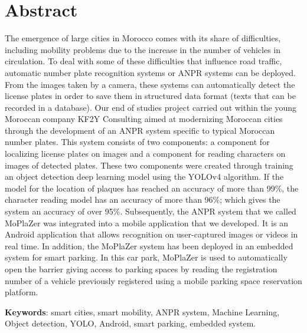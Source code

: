 \chapter*{Abstract}
The emergence of large cities in Morocco comes with its share of difficulties, including mobility problems due to the increase in the number of vehicles in circulation. To deal with some of these difficulties that influence road traffic, automatic number plate recognition systems or ANPR systems can be deployed. From the images taken by a camera, these systems can automatically detect the license plates in order to save them in structured data format (texts that can be recorded in a database). Our end of studies project carried out within the young Moroccan company KF2Y Consulting aimed at modernizing Moroccan cities through the development of an ANPR system specific to typical Moroccan number plates. This system consists of two components: a component for localizing license plates on images and a component for reading characters on images of detected plates. These two components were created through training an object detection deep learning model using the YOLOv4 algorithm. If the model for the location of plaques has reached an accuracy of more than 99\%, the character reading model has an accuracy of more than 96\%; which gives the system an accuracy of over 95\%. Subsequently, the ANPR system that we called MoPlaZer was integrated into a mobile application that we developed. It is an Android application that allows recognition on user-captured images or videos in real time. In addition, the MoPlaZer system has been deployed in an embedded system for smart parking. In this car park, MoPlaZer is used to automatically open the barrier giving access to parking spaces by reading the registration number of a vehicle previously registered using a mobile parking space reservation platform.


\textbf{Keywords}: smart cities, smart mobility, ANPR system, Machine Learning, Object detection, YOLO, Android, smart parking, embedded system.
